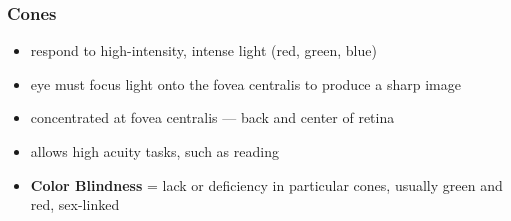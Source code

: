 \documentclass[a4paper,12pt]{article}
\begin{document}
\subsubsection{Cones}
\begin{itemize}
    \item{respond to high-intensity, intense light (red, green, blue)}
    \item{eye must focus light onto the fovea centralis to produce a sharp image}
    \item{concentrated at fovea centralis --- back and center of retina}
    \item{allows high acuity tasks, such as reading}
    \item{\textbf{Color Blindness} = lack or deficiency in particular cones, usually green and red, sex-linked}
\end{itemize}
\end{document}
